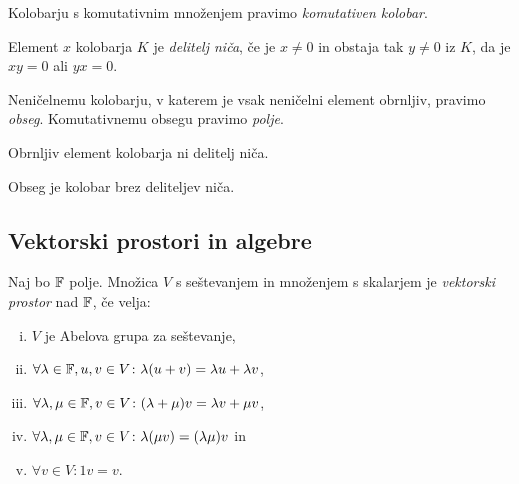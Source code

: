 \obvs

\begin{definicija}
Kolobarju s komutativnim množenjem pravimo \emph{komutativen kolobar}.
\end{definicija}

\begin{definicija}
Element $x$ kolobarja $K$ je \emph{delitelj niča}, če je $x \ne 0$ in obstaja tak $y \ne 0$ iz $K$, da je $xy = 0$ ali $yx = 0$.
\end{definicija}

\begin{definicija}
Neničelnemu kolobarju, v katerem je vsak neničelni element obrnljiv, pravimo \emph{obseg}. Komutativnemu obsegu pravimo \emph{polje}.
\end{definicija}

\begin{trditev}
Obrnljiv element kolobarja ni delitelj niča.
\end{trditev}

\obvs

\begin{posledica}
Obseg je kolobar brez deliteljev niča.
\end{posledica}

\newpage

\subsection{Vektorski prostori in algebre}

\begin{definicija}
Naj bo $\mathbb{F}$ polje. Množica $V$ s seštevanjem in množenjem s skalarjem je \emph{vektorski prostor} nad $\mathbb{F}$, če velja:

\begin{enumerate}[i)]
\item $V$ je Abelova grupa za seštevanje,
\item $\forall \lambda \in \mathbb{F}, u,v \in V \colon \lambda(u+v) = \lambda u + \lambda v$,
\item $\forall \lambda, \mu \in \mathbb{F}, v \in V \colon (\lambda + \mu)v = \lambda v + \mu v$,
\item $\forall \lambda, \mu \in \mathbb{F}, v \in V \colon \lambda(\mu v) = (\lambda \mu)v$ in
\item $\forall v \in V \colon 1v = v$.
\end{enumerate}
\end{definicija}

